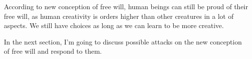 According to new conception of free will, human beings can still be proud of their free will, as human creativity is orders higher than other creatures in a lot of aspects. We still have choices as long as we can learn to be more creative.


In the next section, I'm going to discuss possible attacks on the new conception of free will and respond to them.


